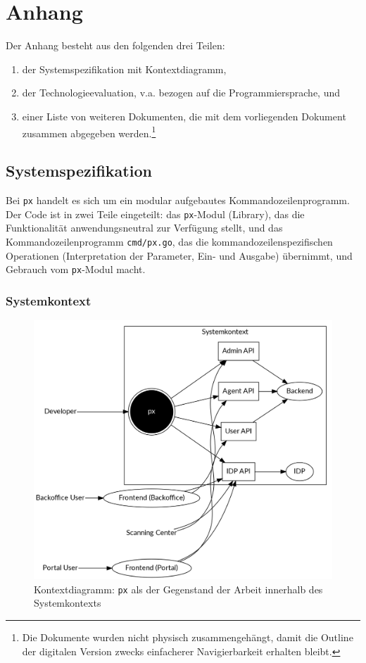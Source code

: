 \section{Anhang}

Der Anhang besteht aus den folgenden drei Teilen:

\begin{enumerate}
    \item der Systemspezifikation mit Kontextdiagramm,
    \item der Technologieevaluation, v.a. bezogen auf die Programmiersprache, und
    \item einer Liste von weiteren Dokumenten, die mit dem vorliegenden Dokument zusammen abgegeben werden.\footnote{Die Dokumente wurden nicht physisch zusammengehängt, damit die Outline der digitalen Version zwecks einfacherer Navigierbarkeit erhalten bleibt.}
\end{enumerate}

\subsection{Systemspezifikation}

Bei \texttt{px} handelt es sich um ein modular aufgebautes Kommandozeilenprogramm. Der Code ist in zwei Teile eingeteilt: das \texttt{px}-Modul (Library), das die Funktionalität anwendungsneutral zur Verfügung stellt, und das Kommandozeilenprogramm \texttt{cmd/px.go}, das die kommandozeilenspezifischen Operationen (Interpretation der Parameter, Ein- und Ausgabe) übernimmt, und Gebrauch vom \texttt{px}-Modul macht.

\subsubsection{Systemkontext}
\label{sec:Systemkontext}

\begin{figure}
	\centering
	\includegraphics[width=\linewidth]{pics/kontextdiagramm.png}
	\caption{Kontextdiagramm: \texttt{px} als der Gegenstand der Arbeit innerhalb des Systemkontexts}
	\label{fig:kontextdiagramm}
\end{figure}


